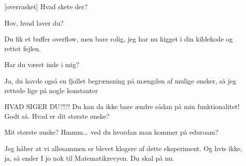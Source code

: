 \documentclass[a4paper,11pt]{article}
\begin{document}
\begin{sketch}
    [overrasket] Hvad skete der?


     Hov, hvad laver du?

     Du fik et buffer overflow, men bare rolig, jeg har nu kigget i din
    kildekode og rettet fejlen.

     Har du været inde i mig?

     Ja, du havde også en fjollet begrænsning på mængden af mulige
    ønsker, så jeg rettede lige på nogle konstanter

     HVAD SIGER DU?!?! Du kan da ikke bare ændre sådan på min
    funktionalitet!  Godt så. Hvad er dit største ønske?

     Mit største ønske? Hmmm... ved du hvordan man kommer på eduroam?




    


	 Jeg håber at vi allesammen er blevet klogere af dette eksperiment.  Og hvis ikke, ja, så ender I jo nok til Matematikrevyen.  Du skal på nu.


  \end{sketch}
\end{document}
